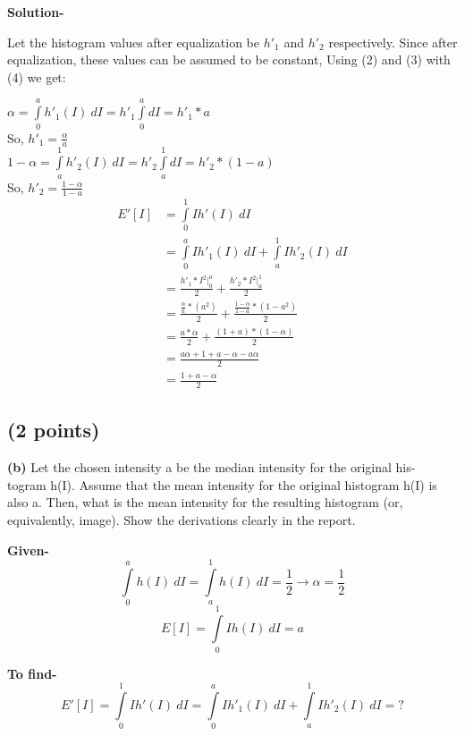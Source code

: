 \documentclass{article}
\begin{document}
\textbf{Solution-}

Let the histogram values after equalization be $h'_1$ and $h'_2$ respectively. Since after equalization, these values can be assumed to be constant,
Using (2) and (3) with (4) we get:

$\alpha = \int\limits_0^a h'_1(I) \ dI = h'_1\int\limits_0^a dI = h'_1*a$ \\
So, $h'_1 = \frac{\alpha}{a}$ \\
$1-\alpha = \int\limits_a^1 h'_2(I) \ dI = h'_2\int\limits_a^1 dI = h'_2*(1 - a)$ \\
So, $h'_2 = \frac{1 -\alpha}{1 - a}$
\begin{equation}
\begin{split}
E'[I] & = \int\limits_0^1 I h'(I) \ dI  \\
      & = \int\limits_0^a I h'_1(I) \ dI + \int\limits_a^1 I h'_2(I) \ dI \\
      & = \frac{h'_1 * I^2|_0^a}{2} + \frac{h'_2 * I^2|_a^1}{2} \\
      & = \frac{\frac{\alpha}{a}*(a^2)}{2} + \frac{\frac{1-\alpha}{1-a}*(1-a^2)}{2} \\
      & = \frac{a*\alpha}{2} + \frac{(1+a)*(1-\alpha)}{2} \\
      & = \frac{a\alpha+1+a-\alpha-a\alpha}{2} \\
      & = \frac{1+a-\alpha}{2}
\end{split}
\end{equation}

\subsection{(2 points)}
\textbf{(b)} Let the chosen intensity a be the median intensity for the original his-
togram h(I). Assume that the mean intensity for the original histogram h(I)
is also a. Then, what is the mean intensity for the resulting histogram (or,
equivalently, image). Show the derivations clearly in the report.

\textbf{Given-}
\begin{equation}\int\limits_0^a h(I) \ dI =\int\limits_a^1 h(I) \ dI = \frac{1}{2} \rightarrow \alpha = \frac{1}{2}\end{equation}
\begin{equation}E[I] = \int\limits_0^1 I h(I) \ dI =a\end{equation}

\textbf{To find-}
\begin{equation}E'[I] = \int\limits_0^1 I h'(I) \ dI = \int\limits_0^a I h'_1(I) \ dI + \int\limits_a^1 Ih'_2(I) \ dI = ?\end{equation}
\end{document}
